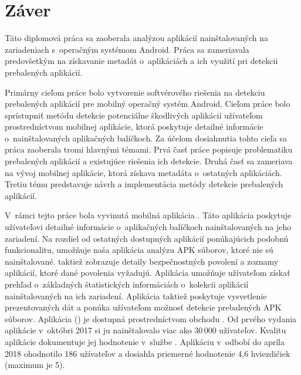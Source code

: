 \chapter*{Záver}
Táto diplomová práca sa zaoberala analýzou aplikácií nainštalovaných na zariadeniach s~operačným systémom Android. Práca sa zameriavala predovšetkým na získavanie metadát o~aplikáciách a ich využití pri detekcii prebalených aplikácií.

Primárny cieľom práce bolo vytvorenie softvérového riešenia na detekciu prebalených aplikácií pre mobilný operačný systém Android. Cieľom práce bolo sprístupniť metódu detekcie potenciálne škodlivých aplikácií užívateľom prostredníctvom mobilnej aplikácie, ktorá poskytuje detailné informácie o~nainštalovaných aplikačných balíčkoch.  
Za účelom dosiahnutia tohto cieľa sa práca zaoberala tromi hlavnými témami. Prvá časť práce popisuje problematiku prebalených aplikácií a existujúce riešenia ich detekcie. Druhá časť sa zameriava na vývoj mobilnej aplikácie, ktorá získava metadáta o~ostatných aplikáciách. Tretiu tému predstavuje návrh a implementácia metódy detekcie prebalených aplikácií. 

V~rámci tejto práce bola vyvinutá mobilná aplikácia . Táto aplikácia poskytuje užívateľovi detailné informácie o~aplikačných balíčkoch nainštalovaných na jeho zariadení. Na rozdiel od ostatných dostupných aplikácií ponúkajúcich podobnú funkcionalitu, umožňuje naša aplikácia analýzu APK súborov, ktoré nie sú nainštalované.  taktiež zobrazuje detaily bezpečnostných povolení a zoznamy aplikácií, ktoré dané povolenia vyžadujú. Aplikácia umožňuje užívateľom získať prehľad o~základných štatistických informáciách o~kolekcii aplikácií nainštalovaných na ich zariadení. Aplikácia taktiež poskytuje vysvetlenie prezentovaných dát a ponúka užívateľom možnosť detekcie prebalených APK súborov. Aplikácia  () je dostupná prostredníctvom obchodu . Od prvého vydania aplikácie v~októbri 2017 si ju nainštalovalo viac ako 30\,000 užívateľov. Kvalitu aplikácie dokumentuje jej hodnotenie v~službe . Aplikáciu v~odbobí do apríla 2018 ohodnotilo 186 užívateľov a dosiahla priemerné hodnotenie 4,6 hviezdičiek (maximum je 5).

